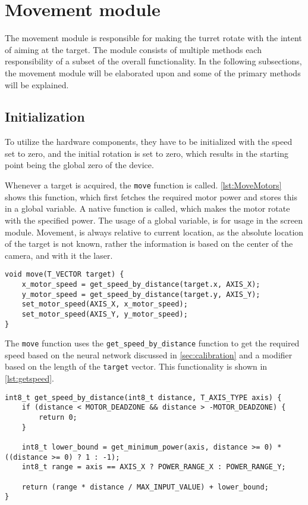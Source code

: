 \section{Movement module}
\label{sec:movement}
The movement module is responsible for making the turret rotate with the intent of aiming at the target.
The module consists of multiple methods each responsibility of a subset of the overall functionality.
In the following subsections, the movement module will be elaborated upon and some of the primary methods will be explained.

\subsection{Initialization}
To utilize the hardware components, they have to be initialized with the speed set to zero, and the initial rotation is set to zero, which results in the starting point being the global zero of the device.

Whenever a target is acquired, the \texttt{move} function is called.
\autoref{lst:MoveMotors} shows this function, which first fetches the required motor power and stores this in a global variable.
A native function is called, which makes the motor rotate with the specified power.
The usage of a global variable, is for usage in the screen module.
Movement, is always relative to current location, as the absolute location of the target is not known, rather the information is based on the center of the camera, and with it the laser.

\begin{lstlisting}[language=CSharp,caption={move method from movement.c},label={lst:MoveMotors}]
void move(T_VECTOR target) {
    x_motor_speed = get_speed_by_distance(target.x, AXIS_X);
    y_motor_speed = get_speed_by_distance(target.y, AXIS_Y);
    set_motor_speed(AXIS_X, x_motor_speed);
    set_motor_speed(AXIS_Y, y_motor_speed);
}
\end{lstlisting}


The \texttt{move} function uses the \texttt{get\_speed\_by\_distance} function to get the required speed based on the neural network discussed in \autoref{sec:calibration} and a modifier based on the length of the \texttt{target} vector.
This functionality is shown in \autoref{lst:getspeed}.

\begin{lstlisting}[language=CSharp,caption={get\_speed\_by\_distance method from movement.c},label={lst:getspeed},firstnumber={109}]
  int8_t get_speed_by_distance(int8_t distance, T_AXIS_TYPE axis) {
    if (distance < MOTOR_DEADZONE && distance > -MOTOR_DEADZONE) {
        return 0;
    }

    int8_t lower_bound = get_minimum_power(axis, distance >= 0) * ((distance >= 0) ? 1 : -1);
    int8_t range = axis == AXIS_X ? POWER_RANGE_X : POWER_RANGE_Y;

    return (range * distance / MAX_INPUT_VALUE) + lower_bound;
}
\end{lstlisting}

